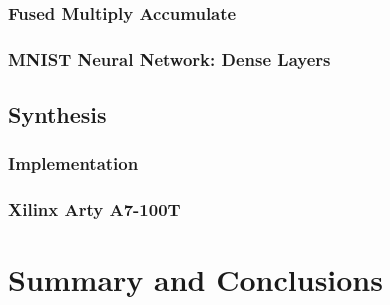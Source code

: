 \documentclass[a4paper,8pt]{report}
\begin{document}
\subsection{Fused Multiply Accumulate}




\subsection{}



\subsection{MNIST Neural Network: Dense Layers}

\section{Synthesis}
\subsection{Implementation}
\subsection{Xilinx Arty A7-100T}

\chapter{Summary and Conclusions} 




\appendix
\singlespacing

 
%  

\end{document}
